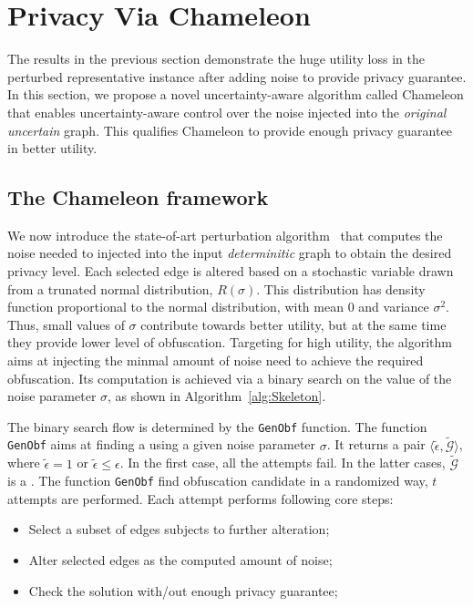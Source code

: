 \section{Privacy Via Chameleon}
\label{sec:tech}
The results in the previous section demonstrate the huge utility loss in the perturbed representative instance after adding noise to provide privacy guarantee. In this section, we propose a novel uncertainty-aware algorithm called Chameleon that enables uncertainty-aware control over the noise injected into the \emph{original uncertain} graph. This qualifies Chameleon to provide enough privacy guarantee in better utility. 

\subsection{The Chameleon framework}

We now introduce the state-of-art perturbation algorithm~\cite{Boldi_Injecting_2012} that computes the noise needed to injected into the input \emph{determinitic} graph to obtain the desired privacy level. Each selected edge is altered based on a stochastic variable drawn from a trunated normal distribution, $R(\sigma)$. This distribution has density function proportional to the normal distribution, with mean $0$ and variance $\sigma^2$. Thus, small values of $\sigma$ contribute towards better utility, but at the same time they provide lower level of obfuscation. Targeting for high utility, the algorithm aims at injecting the minmal amount of noise need to achieve the required obfuscation. Its computation is achieved via a binary search on the value of the noise parameter $\sigma$, as shown in Algorithm~\ref{alg:Skeleton}. 

The binary search flow is determined by the \texttt{GenObf} function. 
The function \texttt{GenObf} aims at finding a {\keobf} using a given noise parameter $\sigma$.
It returns a pair $\langle \tilde{\epsilon}, \tilde{\mathcal{G}} \rangle$, where $\tilde{\epsilon} =1$ or $\tilde{\epsilon} \le \epsilon$. In the first case, all the attempts fail. In the latter cases, $\tilde{\mathcal{G}}$ is a {\keobf}. 
The function \texttt{GenObf} find obfuscation candidate in a randomized way, $t$ attempts are performed. Each attempt performs following core steps:
\begin{itemize}
    \item{Select a subset of edges subjects to further alteration;}
    \item{Alter selected edges as the computed amount of noise;}
    \item{Check the solution with/out enough privacy guarantee;}
\end{itemize}

